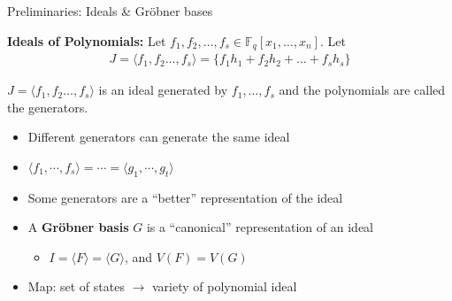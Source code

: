 \documentclass[xcolor=dvipsnames]{beamer}
\newcommand{\bi}{\begin{itemize}}
\newcommand{\ei}{\end{itemize}}
\begin{document}
\begin{frame}{\large{Preliminaries: Ideals \& Gr\"obner bases}}
\vspace{-0.1in}


\begin{Definition}
{\bf Ideals of Polynomials:} Let $f_1, f_2, \ldots, f_s \in
\mathbb{F}_q[x_1, \dots, x_n]$. Let 
\begin{eqnarray}
J = \langle f_1, f_2 \ldots, f_s\rangle = \{f_1 h_1 + f_2 h_2 + \dots + f_s h_s\} \nonumber 
\end{eqnarray}

$J = \langle f_1, f_2 \ldots, f_s\rangle$ is an ideal generated by
$f_1, \ldots, f_s$ and the polynomials are called the generators. 
\end{Definition}

\vspace{-0.1in}

\begin{itemize}
\item Different generators can generate the same ideal
\item $\langle f_1,\cdots,f_s \rangle=\cdots=\langle g_1,\cdots,g_t
  \rangle$
\item Some generators are a ``better'' representation of the ideal
\item A {\bf Gr\"obner basis} $G$ is a ``canonical'' representation of an ideal
	\bi
	\item $I = \langle F \rangle = \langle G \rangle$, and $V(F)=V(G)$
	\ei
\item Map: set of states $\to$ \alert{variety} of polynomial ideal
\end{itemize}
\end{frame}
\end{document}
